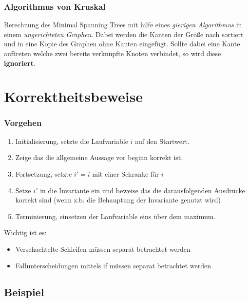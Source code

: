 \documentclass[10pt,a4paper]{article}
\begin{document}
\begin{multicols*}{4}
\subsubsection*{Algorithmus von Kruskal}
Berechnung des Minimal Spanning Trees mit hilfe eines \emph{gierigen Algorithmus} in einem \emph{ungerichteten Graphen}.
Dabei werden die Kanten der Größe nach sortiert und in eine Kopie des Graphen ohne Kanten eingefügt. Sollte dabei eine
Kante auftreten welche zwei bereits verknüpfte Knoten verbindet, so wird diese \textbf{ignoriert}.

\section{Korrektheitsbeweise}

\subsubsection*{Vorgehen}
\begin{enumerate}
	\item Initialisierung, setzte die Laufvariable \(i\) auf den Startwert.
	\item Zeige das die allgemeine Aussage vor beginn korrekt ist.
	\item Fortsetzung, setzte \(i'=i\) mit einer Schranke für \(i\)
	\item Setze \(i'\) in die Invariante ein und beweise das die darausfolgenden Ausdrücke korrekt sind (wenn z.b. die
	      Behauptung der Invariante genutzt wird)
	\item Terminierung, einsetzen der Laufvariable eins über dem maximum.
\end{enumerate}

Wichtig ist es:
\begin{itemize}
	\item Verschachtelte Schleifen müssen separat betrachtet werden
	\item Fallunterscheidungen mittels if müssen separat betrachtet werden
\end{itemize}

\subsection*{Beispiel}

\begin{algorithmic}[h]
	\ENDFOR
\end{algorithmic}


\end{multicols*}
\end{document}

